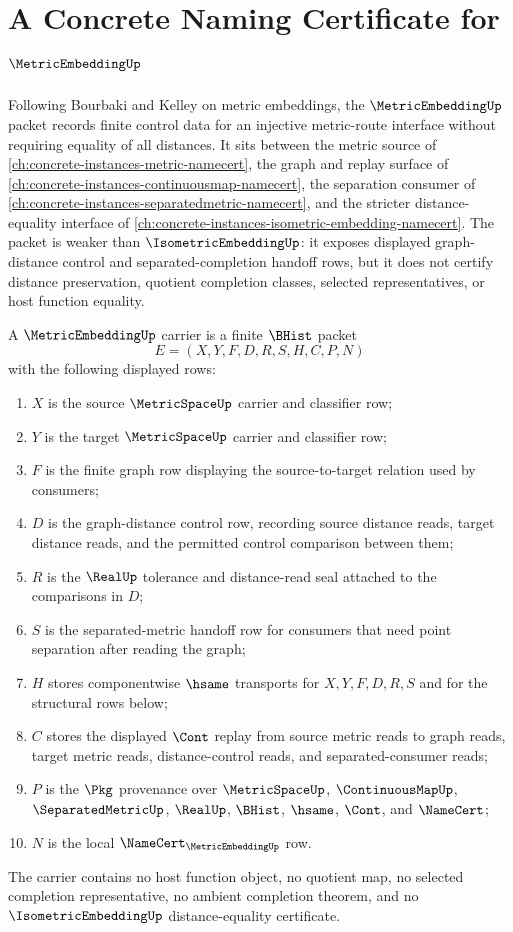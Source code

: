 \chapter{A Concrete Naming Certificate for $\MetricEmbeddingUp$}
\label{ch:concrete-instances-metricembedding-namecert}

Following Bourbaki and Kelley on metric embeddings, the $\MetricEmbeddingUp$ packet records finite control data for an injective metric-route interface without requiring equality of all distances. It sits between the metric source of \autoref{ch:concrete-instances-metric-namecert}, the graph and replay surface of \autoref{ch:concrete-instances-continuousmap-namecert}, the separation consumer of \autoref{ch:concrete-instances-separatedmetric-namecert}, and the stricter distance-equality interface of \autoref{ch:concrete-instances-isometric-embedding-namecert}. The packet is weaker than $\IsometricEmbeddingUp$: it exposes displayed graph-distance control and separated-completion handoff rows, but it does not certify distance preservation, quotient completion classes, selected representatives, or host function equality.

\begin{definition}
\label{def:metric-embedding-carrier}
A $\MetricEmbeddingUp$ carrier is a finite $\BHist$ packet
$$
E=(X,Y,F,D,R,S,H,C,P,N)
$$
with the following displayed rows:
\begin{enumerate}
\item $X$ is the source $\MetricSpaceUp$ carrier and classifier row;
\item $Y$ is the target $\MetricSpaceUp$ carrier and classifier row;
\item $F$ is the finite graph row displaying the source-to-target relation used by consumers;
\item $D$ is the graph-distance control row, recording source distance reads, target distance reads, and the permitted control comparison between them;
\item $R$ is the $\RealUp$ tolerance and distance-read seal attached to the comparisons in $D$;
\item $S$ is the separated-metric handoff row for consumers that need point separation after reading the graph;
\item $H$ stores componentwise $\hsame$ transports for $X,Y,F,D,R,S$ and for the structural rows below;
\item $C$ stores the displayed $\Cont$ replay from source metric reads to graph reads, target metric reads, distance-control reads, and separated-consumer reads;
\item $P$ is the $\Pkg$ provenance over $\MetricSpaceUp$, $\ContinuousMapUp$, $\SeparatedMetricUp$, $\RealUp$, $\BHist$, $\hsame$, $\Cont$, and $\NameCert$;
\item $N$ is the local $\NameCert_{\MetricEmbeddingUp}$ row.
\end{enumerate}
The carrier contains no host function object, no quotient map, no selected completion representative, no ambient completion theorem, and no $\IsometricEmbeddingUp$ distance-equality certificate.
\end{definition}

